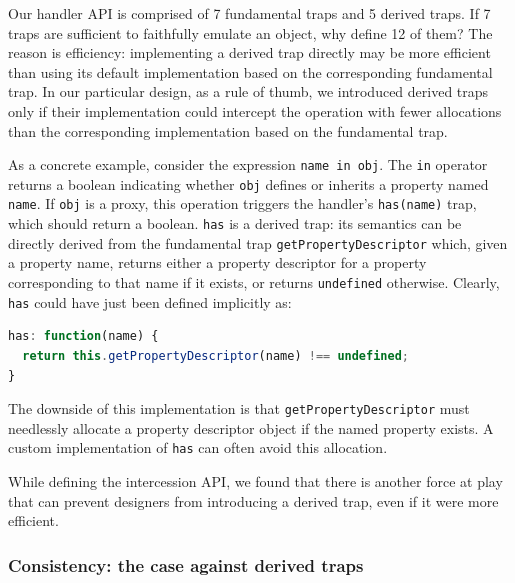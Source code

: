 \documentclass{sig-alternate}
\begin{document}
Our handler API is comprised of 7 fundamental traps and 5 derived traps. If 7 traps are sufficient to faithfully emulate an object, why define 12 of them? The reason is efficiency: implementing a derived trap directly may be more efficient than using its default implementation based on the corresponding fundamental trap. In our particular design, as a rule of thumb, we introduced derived traps only if their implementation could intercept the operation with fewer allocations than the corresponding implementation based on the fundamental trap.

As a concrete example, consider the expression \texttt{name in obj}. The \texttt{in} operator returns a boolean indicating whether \texttt{obj} defines or inherits a property named \texttt{name}. If \texttt{obj} is a proxy, this operation triggers the handler's \texttt{has(name)} trap, which should return a boolean. \texttt{has} is a derived trap: its semantics can be directly derived from the fundamental trap \texttt{getPropertyDescriptor} which, given a property name, returns either a property descriptor for a property corresponding to that name if it exists, or returns \texttt{undefined} otherwise. Clearly, \texttt{has} could have just been defined implicitly as:

\begin{lstlisting}[language=javascript]
has: function(name) {
  return this.getPropertyDescriptor(name) !== undefined;
}
\end{lstlisting}

The downside of this implementation is that \texttt{getPropertyDescriptor} must needlessly allocate a property descriptor object if the named property exists. A custom implementation of \texttt{has} can often avoid this allocation.


While defining the intercession API, we found that there is another force at play that can prevent designers from introducing a derived trap, even if it were more efficient.

\subsubsection{Consistency: the case against derived traps}
\end{document}
